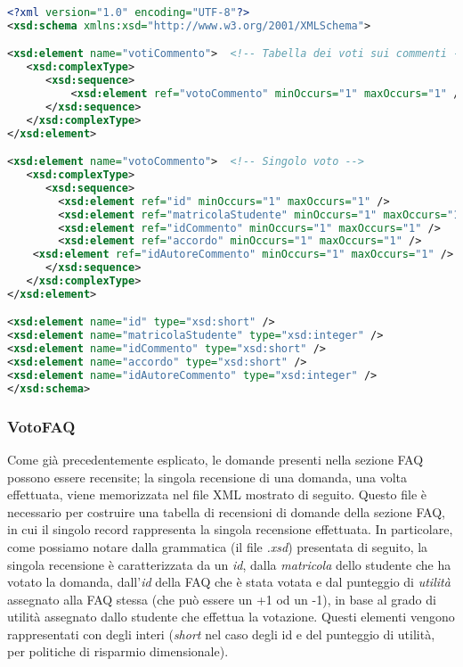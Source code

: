 \documentclass [a4paper,11pt]{book}
\begin{document}
\begin{lstlisting}[language=XML]
<?xml version="1.0" encoding="UTF-8"?>
<xsd:schema xmlns:xsd="http://www.w3.org/2001/XMLSchema">

<xsd:element name="votiCommento">  <!-- Tabella dei voti sui commenti -->
   <xsd:complexType> 
      <xsd:sequence>
	      <xsd:element ref="votoCommento" minOccurs="1" maxOccurs="1" />
      </xsd:sequence>
   </xsd:complexType>
</xsd:element>

<xsd:element name="votoCommento">  <!-- Singolo voto -->
   <xsd:complexType> 
      <xsd:sequence>
        <xsd:element ref="id" minOccurs="1" maxOccurs="1" /> 
        <xsd:element ref="matricolaStudente" minOccurs="1" maxOccurs="1" />
        <xsd:element ref="idCommento" minOccurs="1" maxOccurs="1" /> 
        <xsd:element ref="accordo" minOccurs="1" maxOccurs="1" /> 
	<xsd:element ref="idAutoreCommento" minOccurs="1" maxOccurs="1" /> 
      </xsd:sequence>
   </xsd:complexType>
</xsd:element>

<xsd:element name="id" type="xsd:short" />
<xsd:element name="matricolaStudente" type="xsd:integer" />
<xsd:element name="idCommento" type="xsd:short" />
<xsd:element name="accordo" type="xsd:short" />
<xsd:element name="idAutoreCommento" type="xsd:integer" /> 
</xsd:schema>
\end{lstlisting}

\medskip

\subsubsection{VotoFAQ}

Come già precedentemente esplicato, le domande presenti nella sezione FAQ possono essere recensite; la singola recensione di una domanda, una volta effettuata, viene memorizzata nel file XML mostrato di seguito. Questo file è necessario per costruire una tabella di recensioni di domande della sezione FAQ, in cui il singolo record rappresenta la singola recensione effettuata. In particolare, come possiamo notare dalla grammatica (il file \emph{.xsd}) presentata di seguito, la singola recensione è caratterizzata da un \emph{id}, dalla \emph{matricola} dello studente che ha votato la domanda, dall'\emph{id} della FAQ che è stata votata e dal punteggio di \emph{utilità} assegnato alla FAQ stessa (che può essere un +1 od un -1), in base al grado di utilità assegnato dallo studente che effettua la votazione. Questi elementi vengono rappresentati con degli interi (\emph{short} nel caso degli id e del punteggio di utilità, per politiche di risparmio dimensionale).
\end{document}
